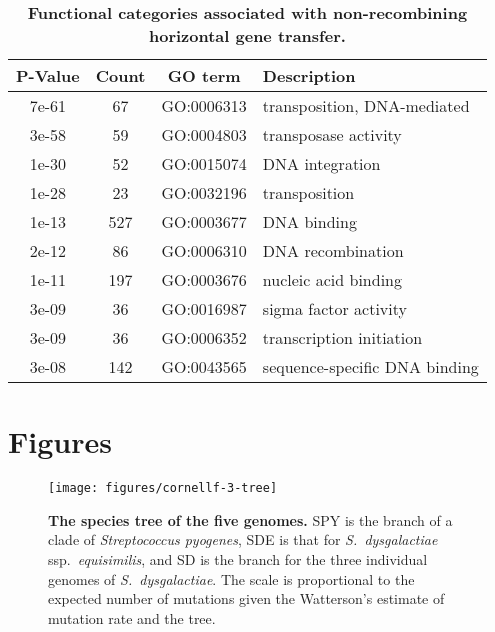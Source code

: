 \documentclass[10pt]{article}
\begin{document}
\begin{table}[!ht]
\caption{
{\bf Functional categories associated with 
non-recombining horizontal gene transfer.}}
\noindent \begin{centering}
\begin{tabular}{cccl}
\hline 
P-Value & Count & GO term & Description \\
\hline 
7e-61 &  67 & GO:0006313 & transposition, DNA-mediated\\
3e-58 &  59 & GO:0004803 & transposase activity\\
1e-30 &  52 & GO:0015074 & DNA integration\\
1e-28 &  23 & GO:0032196 & transposition\\
1e-13 & 527 & GO:0003677 & DNA binding\\
2e-12 &  86 & GO:0006310 & DNA recombination\\
1e-11 & 197 & GO:0003676 & nucleic acid binding\\
3e-09 &  36 & GO:0016987 & sigma factor activity\\
3e-09 &  36 & GO:0006352 & transcription initiation\\
3e-08 & 142 & GO:0043565 & sequence-specific DNA binding\\
\hline 
\end{tabular}
\par\end{centering}
\label{tab:go-events}
\end{table}
\clearpage{}

\section*{Figures}

\begin{figure}[!ht]
\texttt{[image: figures/cornellf-3-tree]}
\caption{
{\bf The species tree of the five genomes.} 
SPY is the branch of a clade of \textit{Streptococcus
pyogenes}, SDE is that for \textit{S.\ dysgalactiae} ssp.\textit{\ equisimilis},
and SD is the branch for the three individual genomes of \textit{S.\
dysgalactiae}. The scale is proportional to the expected number of mutations
given the Watterson's estimate of mutation rate and the tree.}
\label{fig:tree5}
\end{figure}
\clearpage{}%
\end{document}
